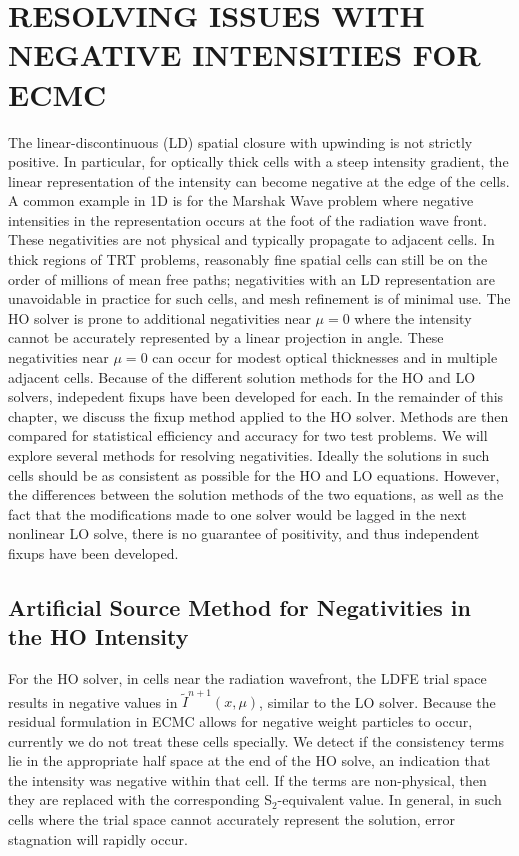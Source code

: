 

\chapter{\uppercase{Resolving Issues with Negative Intensities for ECMC}}
\label{chp:negativities}

The linear-discontinuous (LD) spatial closure with upwinding is not
strictly positive.  In particular, for optically thick cells with a steep intensity
gradient, the linear representation of the intensity can become negative at the edge of the cells.
A common example in 1D is for the Marshak Wave
problem where negative
intensities in the representation occurs at the foot of the radiation wave front. These negativities are not physical and typically propagate to
adjacent cells. In thick regions of
TRT problems, reasonably fine spatial cells can still be on the order of millions of mean
free paths; negativities with an LD representation are unavoidable in practice for
such cells, and mesh refinement is of minimal use.
The HO solver is prone to additional negativities near $\mu=0$ where the intensity
cannot be accurately represented by a linear projection in angle.  These negativities near
$\mu=0$ can occur for modest optical thicknesses and in multiple adjacent cells.
Because of the different solution methods for the HO and LO solvers, indepedent fixups
have been developed for each. 
In the remainder of this chapter, we discuss the fixup method applied to the HO
solver.  Methods are then compared for statistical efficiency and accuracy for two test problems.
      We will explore several methods
for resolving negativities.  Ideally the solutions in
such cells should be as consistent as possible for the HO and LO equations.  However,
the differences between the solution methods of the two equations, as well as the
fact that the modifications made to one solver would be lagged in the next nonlinear LO solve, there
is no guarantee of positivity, and thus independent fixups have been developed.  


\section{Artificial Source Method for Negativities in the HO Intensity}

For the HO solver, in cells near the radiation wavefront, the LDFE trial space results in
negative values in $\tilde{I}^{n+1}(x,\mu)$, similar to the LO solver.  Because the residual formulation in ECMC allows for negative weight
particles to occur, currently we do not treat these cells specially.  We detect if
the consistency terms lie in the appropriate half space at the end of the HO solve,
an indication that the intensity was negative within that cell.  If the terms are non-physical, then
they are replaced with the corresponding S$_2$-equivalent value. In general,
in such cells where the trial space cannot accurately represent the solution, error stagnation will
rapidly occur. 


